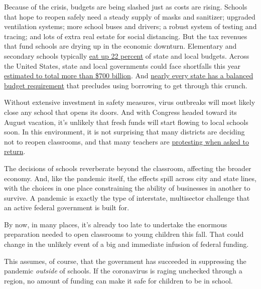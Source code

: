 Because of the crisis, budgets are being slashed just as costs are
rising. Schools that hope to reopen safely need a steady supply of masks
and sanitizer; upgraded ventilation systems; more school buses and
drivers; a robust system of testing and tracing; and lots of extra real
estate for social distancing. But the tax revenues that fund schools are
drying up in the economic downturn. Elementary and secondary schools
typically
\href{https://www.pgpf.org/blog/2020/07/pandemic-budget-crunch-could-force-states-to-slash-social-services-education-police-budgets-and-more}{eat
up 22 percent} of state and local budgets. Across the United States,
state and local governments could face shortfalls this year
\href{https://www.forbes.com/sites/lizfarmer/2020/07/14/trump-cant-withhold-education-funding-but-schools-could-face-a-funding-crisis-anyway/\#_blank}{estimated
to total more than \$700 billion}. And
\href{https://www.pgpf.org/blog/2020/07/pandemic-budget-crunch-could-force-states-to-slash-social-services-education-police-budgets-and-more}{nearly
every state has a balanced budget requirement} that precludes using
borrowing to get through this crunch.

Without extensive investment in safety measures, virus outbreaks will
most likely close any school that opens its doors. And with Congress
headed toward its August vacation, it's unlikely that fresh funds will
start flowing to local schools soon. In this environment, it is not
surprising that many districts are deciding not to reopen classrooms,
and that many teachers are
\href{https://www.nytimes.com/2020/07/29/us/teacher-union-school-reopening-coronavirus.html?searchResultPosition=1}{protesting
when asked to return}.

The decisions of schools reverberate beyond the classroom, affecting the
broader economy. And, like the pandemic itself, the effects spill across
city and state lines, with the choices in one place constraining the
ability of businesses in another to survive. A pandemic is exactly the
type of interstate, multisector challenge that an active federal
government is built for.

By now, in many places, it's already too late to undertake the enormous
preparation needed to open classrooms to young children this fall. That
could change in the unlikely event of a big and immediate infusion of
federal funding.

This assumes, of course, that the government has succeeded in
suppressing the pandemic \emph{outside} of schools. If the coronavirus
is raging unchecked through a region, no amount of funding can make it
safe for children to be in school.

